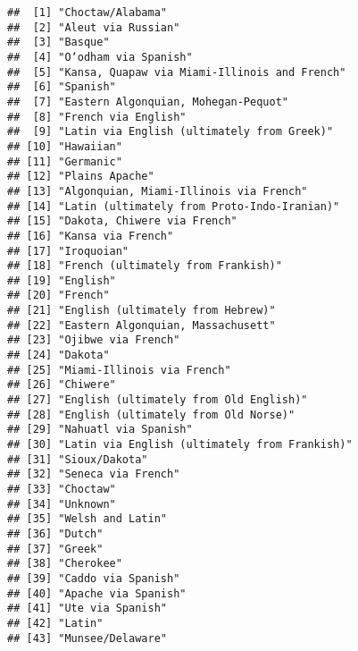 \documentclass[
]{article}
\newenvironment{Shaded}{\begin{snugshade}}{\end{snugshade}}
\newcommand{\FunctionTok}[1]{\textcolor[rgb]{0.00,0.00,0.00}{#1}}
\newcommand{\NormalTok}[1]{#1}
\newcommand{\SpecialCharTok}[1]{\textcolor[rgb]{0.00,0.00,0.00}{#1}}
\begin{document}
\begin{Shaded}
\end{Shaded}

\begin{verbatim}
##  [1] "Choctaw/Alabama"                             
##  [2] "Aleut via Russian"                           
##  [3] "Basque"                                      
##  [4] "Oʼodham via Spanish"                         
##  [5] "Kansa, Quapaw via Miami-Illinois and French" 
##  [6] "Spanish"                                     
##  [7] "Eastern Algonquian, Mohegan-Pequot"          
##  [8] "French via English"                          
##  [9] "Latin via English (ultimately from Greek)"   
## [10] "Hawaiian"                                    
## [11] "Germanic"                                    
## [12] "Plains Apache"                               
## [13] "Algonquian, Miami-Illinois via French"       
## [14] "Latin (ultimately from Proto-Indo-Iranian)"  
## [15] "Dakota, Chiwere via French"                  
## [16] "Kansa via French"                            
## [17] "Iroquoian"                                   
## [18] "French (ultimately from Frankish)"           
## [19] "English"                                     
## [20] "French"                                      
## [21] "English (ultimately from Hebrew)"            
## [22] "Eastern Algonquian, Massachusett"            
## [23] "Ojibwe via French"                           
## [24] "Dakota"                                      
## [25] "Miami-Illinois via French"                   
## [26] "Chiwere"                                     
## [27] "English (ultimately from Old English)"       
## [28] "English (ultimately from Old Norse)"         
## [29] "Nahuatl via Spanish"                         
## [30] "Latin via English (ultimately from Frankish)"
## [31] "Sioux/Dakota"                                
## [32] "Seneca via French"                           
## [33] "Choctaw"                                     
## [34] "Unknown"                                     
## [35] "Welsh and Latin"                             
## [36] "Dutch"                                       
## [37] "Greek"                                       
## [38] "Cherokee"                                    
## [39] "Caddo via Spanish"                           
## [40] "Apache via Spanish"                          
## [41] "Ute via Spanish"                             
## [42] "Latin"                                       
## [43] "Munsee/Delaware"
\end{verbatim}
\end{document}

